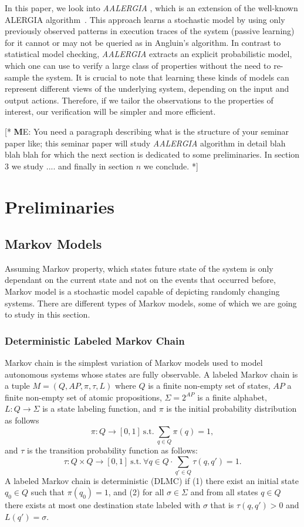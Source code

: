 \documentclass[
a4paper,
12pt
]{scrartcl}
\newcommand\me[1]{ [* {\textbf ME:} #1 *]}
\begin{document}
\par In this paper, we look into \emph{AALERGIA} \cite{Mao.}, which is an extension of the well-known ALERGIA algorithm~\cite{Carrasco.1994}. This approach learns a stochastic model by using only previously observed patterns in execution traces of the system (passive learning) for it cannot or may not be queried as in Angluin's algorithm. In contrast to statistical model checking, \emph{AALERGIA} extracts an explicit probabilistic model, which one can use to verify a large class of properties without the need to re-sample the system. It is crucial to note that learning these kinds of models can represent different views of the underlying system, depending on the input and output actions. Therefore, if we tailor the observations to the properties of interest, our verification will be simpler and more efficient.


\me{You need a paragraph describing what is the structure of your seminar paper like; this seminar paper will study \emph{AALERGIA} algorithm in detail blah blah blah for which the next section is dedicated to some preliminaries. In section 3 we study .... and finally in section $n$ we conclude.}

\newpage
\section{Preliminaries}
\subsection{Markov Models}
Assuming Markov property, which states future state of the system is only dependant on the current state and not on the events that occurred before, Markov model is a stochastic model capable of depicting randomly changing systems. There are different types of Markov models, some of which we are going to study in this section.
\subsubsection{Deterministic Labeled Markov Chain}
Markov chain is the simplest variation of Markov models used to model autonomous systems whose states are fully observable. A labeled Markov chain is a tuple $M=(Q,AP,\pi,\tau,L)$ where $Q$ is a finite non-empty set of states, $AP$ a finite non-empty set of atomic propositions, $\Sigma=2^{AP}$ is a finite alphabet, $L:Q\to \Sigma$ is a state labeling function, and $\pi$ is the initial probability distribution as follows
\begin{equation*}
  \pi:Q\to [0,1]~\text{s.t.}~\sum_{q\in Q} \pi(q)=1,
\end{equation*}
and $\tau$ is the transition probability function as follows:
\begin{equation*}
  \tau: Q\times Q \to [0,1]~\text{s.t.}~\forall q \in Q \cdot \sum_{q'\in Q}\tau(q,q')=1.
\end{equation*}
A labeled Markov chain is deterministic (DLMC) if (1) there exist an initial state $q_0\in Q$ such that $\pi(q_0)=1$, and (2) for all $\sigma \in \Sigma$ and from all states $q \in Q$ there exists at most one destination state labeled with $\sigma$ that is $\tau(q,q')>0$ and $L(q')=\sigma$.
\end{document}
